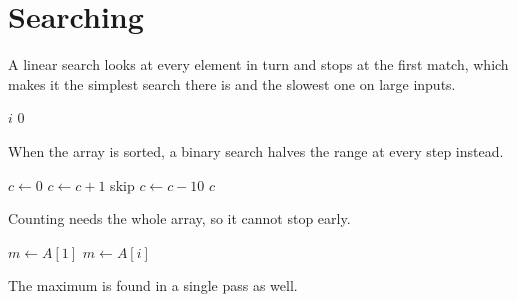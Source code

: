 \documentclass{article}
\begin{document}
\section{Searching}
A linear search looks at every element in turn and stops at the first match, which makes it the simplest search there is and the slowest one on large inputs.

\begin{algorithm}
\caption{Linear search}
\begin{algorithmic}[2]
      \State \Return $i$
    \EndIf
  \EndFor
  \State \Return $0$\hfill\hfill{}
\EndFunction
\end{algorithmic}
\end{algorithm}
When the array is sorted, a binary search halves the range at every step instead.

\begin{algorithm}[t]
\caption{Counting matches}
\begin{algorithmic}
\State $c \gets 0$
   \State $c \gets c + 1$ \Else \State skip \EndIf
\EndFor
{}
  \State $c \gets c - 10$
\EndWhile
\State \Return $c$
\end{algorithmic}
\end{algorithm}
Counting needs the whole array, so it cannot stop early.

\begin{algorithm}[b]
\caption{Maximum}
\begin{algorithmic}[1]
\State $m \gets A[1]$
   \State $m \gets A[i]$ \EndIf
\EndFor
\end{algorithmic}
\end{algorithm}
The maximum is found in a single pass as well.
\end{document}
